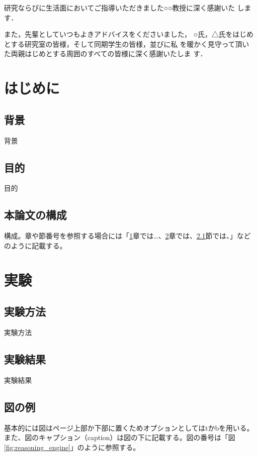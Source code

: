 \documentclass[12pt,dvipdfmx]{jreport}
\begin{document}
研究ならびに生活面においてご指導いただきました○○教授に深く感謝いた
します．

また，先輩としていつもよきアドバイスをくださいました，
○氏，△氏をはじめとする研究室の皆様，そして同期学生の皆様，並びに私
を暖かく見守って頂いた両親はじめとする周囲のすべての皆様に深く感謝いたしま
す．

\tableofcontents %
\listoffigures %
\listoftables %


\chapter{はじめに} \label{chap:intro}
\setcounter{page}{1}   %

 \section{背景}
 背景


 \section{目的}
 目的


 \section{本論文の構成}
 構成。章や節番号を参照する場合には「\ref{chap:intro}章では…、\ref{chap:exp}章では、\ref{sec:method}節では、」などのように記載する。
 

\chapter{実験} \label{chap:exp}
 \section{実験方法} \label{sec:method}
 実験方法

 \section{実験結果}
 実験結果

 
 \section{図の例}

 基本的には図はページ上部か下部に置くためオプションとしてはtかbを用いる。また、図のキャプション（caption）は図の下に記載する。図の番号は「図\ref{fig:reasoning_engine}」のように参照する。
 
\end{document}
